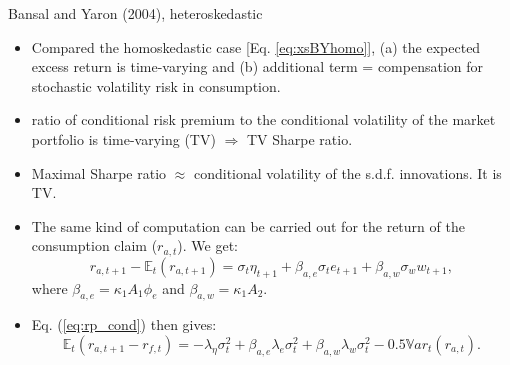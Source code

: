 \begin{frame}{Bansal and Yaron (2004), heteroskedastic}
\begin{footnotesize}
\begin{itemize}
	\item Compared the homoskedastic case [Eq. \ref{eq:xsBYhomo}], (a) the expected excess return is time-varying and (b) additional term = compensation for stochastic volatility risk in consumption.
	\item ratio of conditional risk premium to the conditional volatility of the market portfolio is time-varying (TV) $\Rightarrow$ TV Sharpe ratio.
	\item Maximal Sharpe ratio $\approx$ conditional volatility of the s.d.f. innovations. It is TV.
	
	\vspace{.5cm}
	\item The same kind of computation can be carried out for the return of the consumption claim ($r_{a,t}$). We get:
	\begin{equation}\label{eq:raEraHetero}
	r_{a,t+1} - \mathbb{E}_t(r_{a,t+1}) = \sigma_t \eta_{t+1} + \beta_{a,e}  \sigma_t e_{t+1} + \beta_{a,w}  \sigma_w w_{t+1},
	\end{equation}
	where $\beta_{a,e}=\kappa_1 A_1 \phi_e$ and $\beta_{a,w}=\kappa_1A_2$.
	\item Eq. (\ref{eq:rp_cond}) then gives:
	\begin{equation}\label{eq:xsaBYhetero}
	\mathbb{E}_t(r_{a,t+1} - r_{f,t}) = -\lambda_{\eta} \sigma_t^2 + \beta_{a,e}\lambda_{e} \sigma_t^2 + \beta_{a,w}\lambda_{w} \sigma_t^2 - 0.5 \mathbb{V}ar_t(r_{a,t}).
	\end{equation}
\end{itemize}
\end{footnotesize}
\end{frame}

